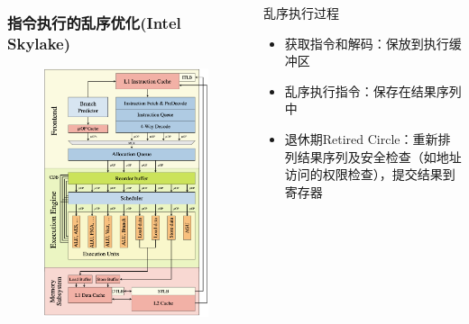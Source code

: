 % 
% 
% 
% 
% 
\begin{frame}
      \begin{columns}
      \begin{column}{0.4\textwidth}
	    \frametitle{指令执行的乱序优化(Intel Skylake)}
		  	\begin{figure}
		  	\includegraphics[width=0.75\linewidth]{figs/skylake-out-of-order.png}
		  	\end{figure}
      \end{column}
      \begin{column}{0.6\textwidth}
		   \begin{block}{乱序执行过程}
		    \begin{itemize}
		        \item 获取指令和解码：保放到执行缓冲区
		        \item 乱序执行指令：保存在结果序列中
		        \item 退休期Retired Circle：重新排列结果序列及安全检查（如地址访问的权限检查），提交结果到寄存器
		    \end{itemize}
		    \end{block}
      \end{column}
      \end{columns}
\end{frame}
